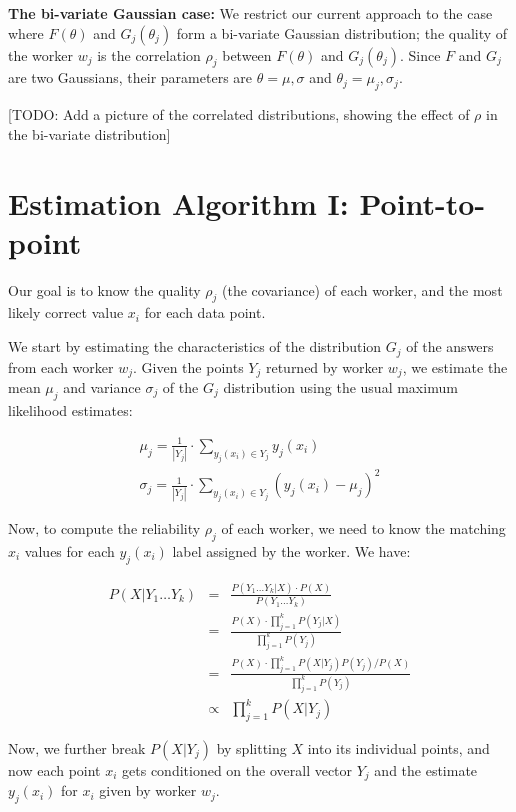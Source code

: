 \documentclass{article}
\begin{document}
\textbf{The bi-variate Gaussian case:} We restrict our current approach to the case where $F(\theta)$ and $G_j(\theta_j)$ form a bi-variate Gaussian distribution; the quality of the worker $w_j$ is the correlation $\rho_j$ between $F(\theta)$ and $G_j(\theta_j)$. Since $F$ and $G_j$ are two Gaussians, their parameters are $\theta={\mu, \sigma}$ and $\theta_j={\mu_j, \sigma_j}$.

[TODO: Add a picture of the correlated distributions, showing the effect of $\rho$ in the bi-variate distribution]


\section{Estimation Algorithm I: Point-to-point}

Our goal is to know the quality $\rho_j$ (the covariance) of each worker, and the most likely correct value  $x_i$ for each data point. 

We start by estimating the characteristics of the distribution $G_j$ of the answers from each worker $w_j$. Given the points $Y_j$ returned by worker $w_j$, we estimate the mean $\mu_j$ and variance $\sigma_j$ of the $G_j$ distribution using the usual maximum likelihood estimates:

\begin{eqnarray}
\mu_j = \frac{1}{|Y_j|}\cdot\sum_{y_j(x_i) \in Y_j} y_j(x_i) \label{equ:muj} \\
\sigma_j= \frac{1}{|Y_j|}\cdot\sum_{y_j(x_i) \in Y_j} (y_j(x_i) - \mu_j)^2 \label{equ:sigmaj}
\end{eqnarray}

Now, to compute the reliability $\rho_j$ of each worker, we need to know the matching $x_i$ values for each $y_j(x_i)$ label assigned by the worker. We have:

\begin{eqnarray}
P ( X | Y_1 \ldots Y_k) &=&  \frac{ P (  Y_1 \ldots Y_k | X ) \cdot P(X)} {P (  Y_1 \ldots Y_k)} \nonumber \\
&=&  \frac{ P(X) \cdot \prod_{j=1}^k P (  Y_j | X )  } {\prod_{j=1}^k P (  Y_j )} \nonumber \\
&=&  \frac{ P(X) \cdot \prod_{j=1}^k P (  X | Y_j ) P(Y_j) / P(X) } {\prod_{j=1}^k P (  Y_j )} \nonumber \\
&\propto&  \prod_{j=1}^k P (  X | Y_j ) \nonumber
\end{eqnarray}

Now, we further break $P(X|Y_j)$ by splitting $X$ into its individual points, and now each point $x_i$ gets conditioned on the overall vector $Y_j$ and the estimate $y_j(x_i)$ for $x_i$ given by worker $w_j$.
\end{document}
